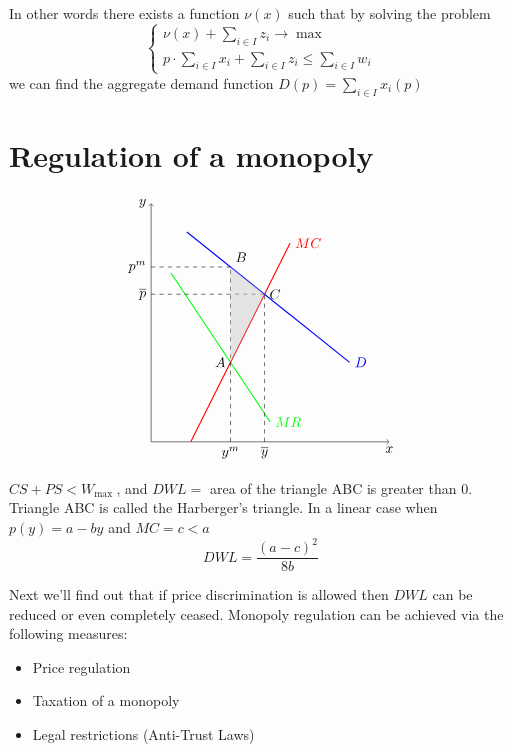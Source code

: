 \documentclass[a4paper, 10pt]{article}
\begin{document}
In other words there exists a function $\nu(x)$ such that by solving the problem
\begin{equation}
    \begin{cases}
        \nu(x)+\sum_{i \in I} z_i \rightarrow \max \\
        p \cdot \sum_{i \in I} x_i+\sum_{i \in I} z_i \leq \sum_{i \in I} w_i
    \end{cases}
\end{equation}
we can find the aggregate demand function $D(p) =\sum_{i\in I}x_i(p)$


\section{Regulation of a monopoly}
\begin{minipage}{0.5\textwidth}
    $$
\begin{tikzpicture}
    \draw[black, ->] (0,0) -- (0,6) node[black, left] {$y$};
    \draw[black, ->] (0,0) -- (6,0) node[black, below] {$x$};
    \draw[green, thick] (0.5,4.25) -- (3, 0.5) node[green, right] {$MR$};
    \draw[red, thick] (1,0) -- (3.5,5) node[red, right] {$MC$};
    \draw[blue, thick] (0.9, 5.28) -- (5, 2) node[blue, right] {$D$};
    \draw[black, dashed] (2,0) node[black, below] {$y^m$} -- (2,4.4);
    \draw[black, dashed] (2.85714,0) node[black, below] {$\overline{y}$} -- (2.85714, 3.71429);
    \draw[black, dashed] (0,4.4) node[black, left] {$p^m$} -- (2,4.4);
    \draw[black, dashed] (0, 3.71429) node[black, left] {$\overline{p}$} -- (2.85714, 3.71429);
    \fill[fill=black!20,opacity=0.5] 
            (2,4.4) node[black!100, opacity=1, above right] {$B$} -- (2,2) node[black!100, opacity=1, left] {$A$} -- (2.85714, 3.71429)  node[black!100, opacity=1, right] {$C$} -- cycle;
    
\end{tikzpicture}
$$
\end{minipage}
\begin{minipage}{0.5\textwidth}
    $C S+P S<W_{\text {max }}$, and $D W L=$ area of the triangle ABC is greater than 0. Triangle ABC is called the Harberger's triangle. In a linear case when $p(y)=a-b y$ and $M C=c<a$
$$
D W L=\frac{(a-c)^2}{8 b}
$$

Next we'll find out that if price discrimination is allowed then $D W L$ can be reduced or even completely ceased. Monopoly regulation can be achieved via the following measures:
\begin{itemize}
    \item Price regulation
    \item Taxation of a monopoly
    \item Legal restrictions (Anti-Trust Laws)
\end{itemize}
\end{minipage}
\end{document}
